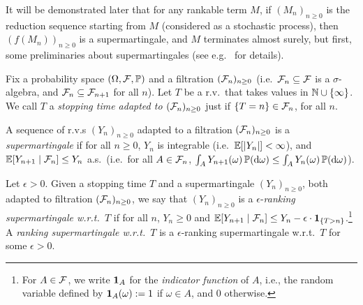 It will be demonstrated later that for any rankable term $M$, if $(M_n)_{n \geq 0}$ is the reduction sequence starting from $M$ (considered as a stochastic process), then $(f(M_n))_{n \geq 0}$ is a supermartingale, and $M$ terminates almost surely, but first, some preliminaries about supermartingales (see e.g.~\cite{Williams1999,Durrett2019} for details).
\iffalse
\lo{It is confusing (strictly speaking, incorrect) to say that $(M_n)_{n \geq 0}$ is a reduction sequence from $M$. Formally $M_n$ is the random variable $M_n: s \mapsto \pi_0 (\red^n(M, s))$.}
\akr{I guess it's implicitly identifying a sequence of functions ($(M_n)_{n \geq 0}$), and a function producing sequences (a reduction-sequence-valued random variable), but this sort of thing seems very standard in dealing with random variables (e.g.~applying a function to some random variables, which is really a sort of concatenation).}
\fi

Fix a probability space $(\Omega, \mathcal{F}, \mathbb{P})$ and a filtration $(\mathcal{F}_n)_{n \geq 0}$ (i.e.~$\mathcal{F}_n \subseteq \mathcal{F}$ is a $\sigma$-algebra, and $\mathcal{F}_n \subseteq \mathcal{F}_{n+1}$ for all $n$). 
Let $T$ be a r.v.~that takes values in $\mathbb{N} \cup \{\infty\}$.
We call $T$ a \emph{stopping time adapted to $(\mathcal{F}_n)_{n \geq 0}$} just if $\{T = n\} \in \mathcal{F}_n$, for all $n$.

\begin{definition}\rm
\begin{asparaenum}[(i)]
\item A sequence of r.v.s $(Y_n)_{n \geq 0}$ adapted to a filtration $(\mathcal{F}_n)_{n \geq 0}$ is a \emph{supermartingale} if for all $n \geq 0$, $Y_n$ is integrable (i.e.~$\mathbb{E}[|Y_n|] < \infty$), and $\mathbb{E}[Y_{n+1} \mid \mathcal{F}_n] \leq Y_n$ a.s.~(i.e.~for all $A \in \mathcal{F}_n$, $\int_A Y_{n+1}(\omega) \, \mathbb{P}(\mathrm{d} \omega) \leq \int_A Y_n(\omega) \, \mathbb{P}(\mathrm{d} \omega)$).
\item Let $\epsilon > 0$. 
Given a stopping time $T$ and a supermartingale $(Y_n)_{n \geq 0}$, both adapted to filtration $(\mathcal{F}_n)_{n \geq 0}$, 
we say that $(Y_n)_{n \geq 0}$ is a $\epsilon$-\emph{ranking supermartingale w.r.t.~$T$} if for all $n$, $Y_n \geq 0$ and $\mathbb{E}[Y_{n+1} \mid \mathcal{F}_n] \leq Y_n - \epsilon \cdot \mathbf{1}_{\{T > n\}}$.\footnote{For $A \in \mathcal{F}$, we write ${\bf 1}_A$ for the \emph{indicator function} of $A$, i.e., the random variable defined by ${\bf 1}_A(\omega) := 1$ if $\omega \in A$, and $0$ otherwise.} %
A \emph{ranking supermartingale w.r.t.~$T$} is a $\epsilon$-ranking supermartingale w.r.t.~$T$ for some $\epsilon > 0$.
\end{asparaenum}
\end{definition}


